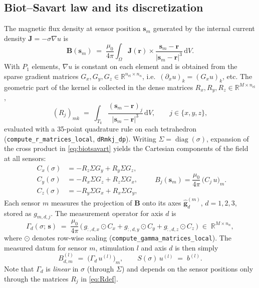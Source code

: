 \documentclass[11pt,a4paper]{article}
\newcommand{\R}{\mathbb{R}}
\newcommand{\dd}{\mathrm{d}}
\newcommand{\sensor}[1]{\bm{s}_{#1}}
\newcommand{\code}[1]{\texttt{#1}}
\begin{document}
\subsection{Biot--Savart law and its discretization}

The magnetic flux density at sensor position $\sensor{m}$ generated by the internal current
density $\bm{J} = -\sigma\nabla u$ is
\begin{equation}
\label{eq:biotsavart}
  \bm{B}(\sensor{m})
  \;=\; \frac{\mu_0}{4\pi} \int_\Omega
        \bm{J}(\bm{r}) \times \frac{\sensor{m} - \bm{r}}{|\sensor{m} - \bm{r}|^3} \, \dd V .
\end{equation}
With $P_1$ elements, $\nabla u$ is constant on each element and is obtained from the sparse
gradient matrices $G_x, G_y, G_z \in \R^{n_{\mathrm{el}} \times n_n}$, i.e.\
$(\partial_x u)_k = (G_x u)_k$, etc. The geometric part of the kernel is collected in the dense
matrices $R_x, R_y, R_z \in \R^{M \times n_{\mathrm{el}}}$,
\begin{equation}
\label{eq:Rdef}
  (R_j)_{mk} \;=\; \int_{T_k} \frac{(\sensor{m} - \bm{r})_j}{|\sensor{m} - \bm{r}|^3}\, \dd V,
  \qquad j \in \{x,y,z\},
\end{equation}
evaluated with a 35-point quadrature rule on each tetrahedron
(\code{compute\_r\_matrices\_local}, \code{dRmkj\_dp}). Writing
$\Sigma = \operatorname{diag}(\sigma)$, expansion of the cross product in
\eqref{eq:biotsavart} yields the Cartesian components of the field at all sensors:
\begin{equation}
\label{eq:Cmatrices}
\begin{aligned}
  C_x(\sigma) &= -R_z \Sigma G_y + R_y \Sigma G_z, \\
  C_y(\sigma) &= -R_x \Sigma G_z + R_z \Sigma G_x, \\
  C_z(\sigma) &= -R_y \Sigma G_x + R_x \Sigma G_y,
\end{aligned}
\qquad
  B_j(\sensor{m}) = \frac{\mu_0}{4\pi}\, \big(C_j\, u\big)_m .
\end{equation}
Each sensor $m$ measures the projection of $\bm{B}$ onto its axes
$\hat{\bm{g}}^{(m)}_d$, $d = 1,2,3$, stored as $g_{m,d,j}$. The measurement operator for
axis $d$ is
\begin{equation}
\label{eq:Gamma}
  \Gamma_d(\sigma;\, \bm{s})
  \;=\; \frac{\mu_0}{4\pi}\,
        \big(\, g_{:,d,x} \odot C_x + g_{:,d,y} \odot C_y + g_{:,d,z} \odot C_z \,\big)
  \;\in\; \R^{M \times n_n},
\end{equation}
where $\odot$ denotes row-wise scaling (\code{compute\_gamma\_matrices\_local}). The measured
datum for sensor $m$, stimulation $l$ and axis $d$ is then simply
\begin{equation}
  B_{d,m}^{(l)} \;=\; \big(\Gamma_d\, u^{(l)}\big)_m,
  \qquad S(\sigma)\, u^{(l)} \;=\; b^{(l)} .
\end{equation}
Note that $\Gamma_d$ is \emph{linear} in $\sigma$ (through $\Sigma$) and depends on the sensor
positions only through the matrices $R_j$ in \eqref{eq:Rdef}.
\end{document}
